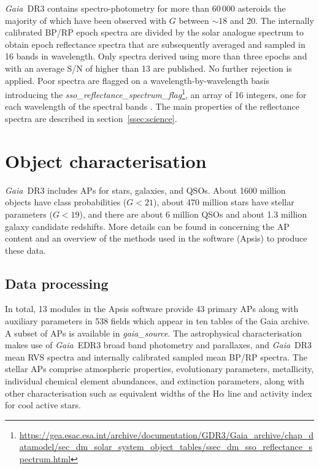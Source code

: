 \documentclass[longauth]{aa}
\makeatletter
\providecommand{\bprp}{BP/RP\xspace}
\providecommand\gmag{\ensuremath{G}\xspace}
\providecommand\gdrthree{\textit{Gaia}~DR3\xspace}
\providecommand\gdr[1]{\textit{Gaia}~DR#1\xspace}
\providecommand\gedr[1]{\textit{Gaia}~EDR#1\xspace}
\providecommand{\linktodoc}{https://gea.esac.esa.int/archive/documentation/GDR3}
\providecommand{\ssotable}[1]{\url{\linktodoc/Gaia_archive/chap_datamodel/sec_dm_solar_system_object_tables/ssec_dm_#1.html}} %
\DeclareRobustCommand*{\fieldName}[1]{%
  \begingroup\@fieldName\scantokens{\texttt{\small {#1}}\noexpand}\endgroup}
\makeatother
\begin{document}

\gdrthree contains spectro-photometry  for more than $60\,000$ asteroids the majority of which have been observed with \gmag between $\sim 18$ and 20. The internally calibrated \bprp epoch spectra are divided by the solar analogue spectrum to obtain epoch reflectance spectra that are subsequently averaged and sampled in 16 bands in wavelength. Only spectra derived using more than three epochs and with an average S/N of higher than 13 are published. No further rejection is applied. Poor spectra are flagged on a wavelength-by-wavelength basis introducing the \textit{sso\_reflectance\_spectrum\_flag}\footnote{\ssotable{sso_reflectance_spectrum}}, %
an array of 16 integers, one for each wavelength of the spectral bands \citep{DR3-DPACP-89}. The main properties of the reflectance spectra are described in section~\ref{ssec:science}.

\section{Object characterisation} \label{ssec:classif}

\gdrthree includes APs for  stars, galaxies, and QSOs. About 1600 million objects have class probabilities ($G<21$), about 470 million stars have stellar parameters ($G<19$), and there are about 6 million QSOs and  about 1.3 million galaxy candidate redshifts.  More details can be found in \cite{DR3-DPACP-157} concerning the AP content and an overview of the methods used in the software (Apsis) to produce these data. 

\subsection{Data processing}

In total, 13  modules in the Apsis software provide 43 primary APs along with auxiliary parameters in 538  fields which appear in ten  tables  of  the  Gaia archive. A subset of APs is available in \textit{gaia\_source}. The astrophysical characterisation makes use of  \gedr{3} broad band photometry and parallaxes, and \gdr{3} mean RVS spectra and internally calibrated sampled  mean BP/RP spectra.
The stellar APs comprise  atmospheric properties, evolutionary parameters, metallicity, individual chemical element abundances, and extinction parameters, along with other characterisation such as equivalent widths of the H$\alpha$ line and activity index for cool active stars.   
\end{document}
